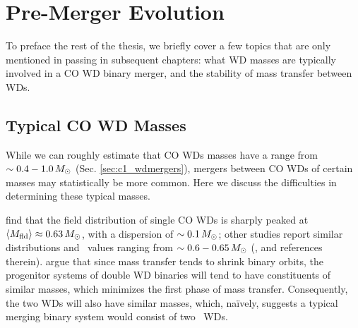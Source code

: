 \section{Pre-Merger Evolution}


To preface the rest of the thesis, we briefly cover a few topics that are only mentioned in passing in subsequent chapters: what WD masses are typically involved in a CO WD binary merger, and the stability of mass transfer between WDs.

\subsection{Typical CO WD Masses}
\label{ssec:c1_cowd_massrange}

While we can roughly estimate that CO WDs masses have a range from $\sim0.4 - 1.0\,\Msun$ (Sec. \ref{sec:c1_wdmergers}), mergers between CO WDs of certain masses may statistically be more common.  Here we discuss the difficulties in determining these typical masses.


\cite{trem+16} find that the field distribution of single CO WDs is sharply peaked at $\Mmean \approx 0.63\,\Msun$, with a dispersion of $\sim0.1\,\Msun$; other studies report similar distributions and \Mmean\ values ranging from $\sim0.6 - 0.65\,\Msun$ (\citealt{klei+13}, and references therein).  \citeal{vkercj10} argue that since mass transfer tends to shrink binary orbits, the progenitor systems of double WD binaries will tend to have constituents of similar masses, which minimizes the first phase of mass transfer.  Consequently, the two WDs will also have similar masses, which, na\"{i}vely, suggests a typical merging binary system would consist of two \Mmean\ WDs.



